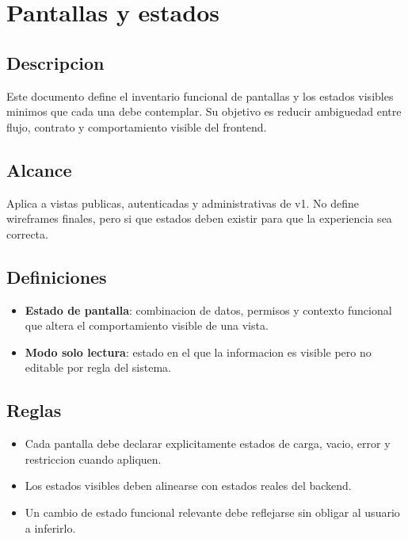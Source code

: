 \section{Pantallas y estados}

\subsection{Descripcion}

Este documento define el inventario funcional de pantallas y los estados visibles minimos que cada una debe contemplar. Su objetivo es reducir ambiguedad entre flujo, contrato y comportamiento visible del frontend.

\subsection{Alcance}

Aplica a vistas publicas, autenticadas y administrativas de v1. No define wireframes finales, pero si que estados deben existir para que la experiencia sea correcta.

\subsection{Definiciones}

\begin{itemize}
  \item \textbf{Estado de pantalla}: combinacion de datos, permisos y contexto funcional que altera el comportamiento visible de una vista.
  \item \textbf{Modo solo lectura}: estado en el que la informacion es visible pero no editable por regla del sistema.
\end{itemize}

\subsection{Reglas}

\begin{itemize}
  \item Cada pantalla debe declarar explicitamente estados de carga, vacio, error y restriccion cuando apliquen.
  \item Los estados visibles deben alinearse con estados reales del backend.
  \item Un cambio de estado funcional relevante debe reflejarse sin obligar al usuario a inferirlo.
\end{itemize}

